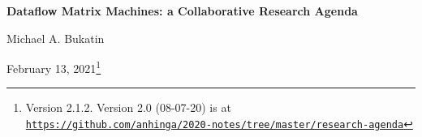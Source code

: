 \documentclass{article}
\begin{document}
\renewcommand{\abstractname}{\vspace{-\baselineskip}}

\renewcommand\contentsname{\vspace{-\baselineskip}}


\begin{center}

{\bf Dataflow Matrix Machines:  a Collaborative Research Agenda}
                                   



\vspace{0.1in}
Michael A. Bukatin


\vspace{0.085in}
February 13, 2021\footnote{Version 2.1.2. Version 2.0 (08-07-20) is at
\href{https://github.com/anhinga/2020-notes/tree/master/research-agenda}
{\tt https://github.com/anhinga/2020-notes/tree/master/research-agenda}}

\end{center}
\end{document}
